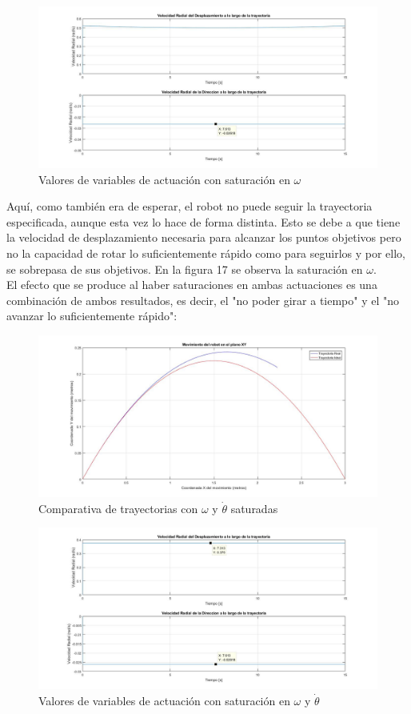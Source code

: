 \documentclass[a4paper,twoside]{article}
\begin{document}
\newpage
\begin{figure}[h!]
	\centering
	\includegraphics[width=1\textwidth]{parab_7}
	\caption{Valores de variables de actuación con saturación en $\omega$}
\end{figure}
Aquí, como también era de esperar, el robot no puede seguir la trayectoria especificada, aunque esta vez lo hace de forma distinta. Esto se debe a que tiene la velocidad de desplazamiento necesaria para alcanzar los puntos objetivos pero no la capacidad de rotar lo suficientemente rápido como para seguirlos y por ello, se sobrepasa de sus objetivos. En la figura 17 se observa la saturación en $\omega$.\\
El efecto que se produce al haber saturaciones en ambas actuaciones es una combinación de ambos resultados, es decir, el "no poder girar a tiempo" y el "no avanzar lo suficientemente rápido":
\begin{figure}[h!]
	\centering
	\includegraphics[width=1\textwidth]{parab_8}
	\caption{Comparativa de trayectorias con $\omega$ y $\dot{\theta}$ saturadas}
\end{figure}
\newpage
\begin{figure}[h!]
	\centering
	\includegraphics[width=1\textwidth]{parab_9}
	\caption{Valores de variables de actuación con saturación en $\omega$ y $\dot{\theta}$}
\end{figure}
\end{document}
